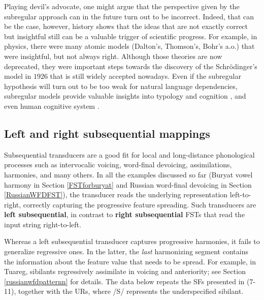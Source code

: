 Playing devil's advocate, one might argue that the perspective given by the subregular approach can in the future turn out to be incorrect.
Indeed, that can be the case, however, history shows that the ideas that are not exactly correct but insightful still can be a valuable trigger of scientific progress.
For example, in physics, there were many atomic models (Dalton's, Thomson's, Bohr's a.o.) that were insightful, but not always right.
Although those theories are now deprecated, they were important steps towards the discovery of the Schr\"odinger's model in $1926$ that is still widely accepted nowadays.
Even if the subregular hypothesis will turn out to be too weak for natural language dependencies, subregular models provide valuable insights into typology and cognition \citep{Heinz-Lai-2013-VHS,Luo2017}, and even human cognitive system \citep{RogersPullum2011,Lai15,Avcu2018}.




\subsection{Left and right subsequential mappings}


Subsequential transducers are a good fit for local and long-distance phonological processes such as intervocalic voicing, word-final devoicing, assimilations, harmonies, and many others.
In all the examples discussed so far (Buryat vowel harmony in Section \ref{FSTforburyat} and Russian word-final devoicing in Section \ref{RussianWFDFST}), the transducer reads the underlying representation left-to-right, correctly capturing the progressive feature spreading.
Such transducers are \textbf{left subsequential}, in contrast to \textbf{right subsequential} FSTs that read the input string right-to-left.

Whereas a left subsequential transducer captures progressive harmonies, it fails to generalize regressive ones.
In the latter, the \emph{last} harmonizing segment contains the information about the feature value that needs to be spread.
For example, in Tuareg, sibilants regressively assimilate in voicing and anteriority; see Section \ref{russianwfdpatternn} for details.
The data below repeats the SFs presented in (7-11), together with the URs, where /S/ represents the underspecified sibilant.

